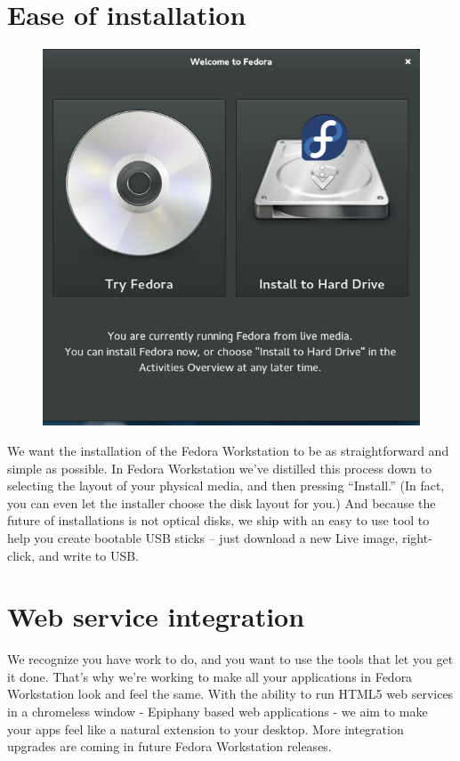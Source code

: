 \documentclass[
10pt
]{leaflet}
\begin{document}
\section{\textcolor{FedoraBlue}{Ease of installation}}
\begin{figure}[h]
  \includegraphics[keepaspectratio,width=\textwidth]{Workstation-anaconda-0-cropped.png}
\end{figure}
We want the installation of the Fedora Workstation to be as straightforward and simple as possible. In Fedora Workstation we've distilled this process down to selecting the layout of your physical media, and then pressing ``Install.'' (In fact, you can even let the installer choose the disk layout for you.) And because the future of installations is not optical disks, we ship with an easy to use tool to help you create bootable USB sticks -- just download a new Live image, right-click, and write to USB.

\section{\textcolor{FedoraBlue}{Web service integration}}
We recognize you have work to do, and you want to use the tools that let you get it done. That's why we're working to make all your applications in Fedora Workstation look and feel the same. With the ability to run HTML5 web services in a chromeless window - Epiphany based web applications - we aim to make your apps feel like a natural extension to your desktop. More integration upgrades are coming in future Fedora Workstation releases.
\end{document}
